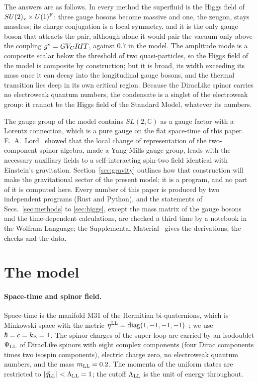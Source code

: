 \documentclass[aps,prd,twocolumn,superscriptaddress,nofootinbib,floatfix,longbibliography]{revtex4-2}
\newcommand{\LL}{{\rm LL}}
\begin{document}
The answers are as follows. In every method the superfluid is the Higgs field of $SU(2)_{\rm v}\times U(1)^{\rm F}$: three gauge
bosons become massive and one, the zeugon, stays massless; its charge conjugation is a local symmetry, and it is the only
gauge boson that attracts the pair, although alone it would pair the vacuum only above the coupling
$g^{\rm v}={{GV_CRIT}}$, against $0.7$ in the model. The amplitude mode is a composite scalar below the threshold of two
quasi-particles, so the Higgs field of the model is composite by construction; but it is broad, its width exceeding its
mass once it can decay into the longitudinal gauge bosons, and the thermal transition lies deep in its own critical
region. Because the DiracLike spinor carries no electroweak quantum numbers, the condensate is a singlet of the electroweak
group: it cannot be the Higgs field of the Standard Model, whatever its numbers.

The gauge group of the model contains $SL(2,\mathbb C)$ as a gauge factor with a Lorentz connection, which is a pure gauge
on the flat space-time of this paper. E.~A.~Lord~\cite{Lord1971} showed that the local change of representation of the
two-component spinor algebra, made a Yang-Mills gauge group, leads with the necessary auxiliary fields to a self-interacting
spin-two field identical with Einstein's gravitation. Section~\ref{sec:gravity} outlines how that construction will
make the gravitational sector of the present model; it is a program, and no part of it is computed here. Every number of
this paper is produced by two independent programs (Rust and Python), and the statements of Secs.~\ref{sec:methods} to
\ref{sec:higgs}, except the mass matrix of the gauge bosons and the time-dependent calculations, are checked a third time by
a notebook in the Wolfram Language; the Supplemental Material~\cite{SM} gives the derivations, the checks and the data.

\section{The model}
\label{sec:model}

\paragraph*{Space-time and spinor field.}
Space-time is the manifold M31 of the Hermitian bi-quaternions, which is Minkowski space with the metric
$\eta^\LL={\rm diag}(1,-1,-1,-1)$~\cite{Nash2026}; we use $\hbar=c=k_{\rm B}=1$. The spinor charges of the super-loop are
carried by an isodoublet $\Psi_\LL$ of DiracLike spinors with eight complex components (four Dirac components times two
isospin components), electric charge zero, no electroweak quantum numbers, and the mass $m_\LL=0.2$. The momenta of the uniform states are restricted to $|\vec q_\LL|<\Lambda_\LL=1$; the cutoff
$\Lambda_\LL$ is the unit of energy throughout.
\end{document}
